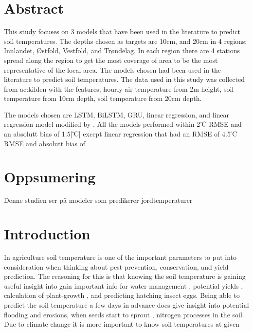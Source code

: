 
\section*{Abstract}
This study focuses on 3 models that have been used in the literature to predict soil temperatures. The depths chosen as targets are 10cm, and 20cm in 4 regions; Innlandet, Østfold, Vestfold, and Trøndelag. In each region there are 4 stations spread along the region to get the most coverage of area to be the most representative of the local area. The models chosen had been used in the literature to predict soil temperatures. The data used in this study was collected from \acrshort{ac:kilden} with the features; hourly air temperature from 2m height, soil temperature from 10cm depth, soil temperature from 20cm depth.

The models chosen are LSTM, BiLSTM, GRU, linear regression, and linear regression model modified by \citeauthor{plauborg_simple_2002}. All the models performed within 2℃ RMSE and an absolutt bias of 1.5|℃| except linear regression that had an RMSE of 4.5℃ RMSE  and absolutt bias of 

\section*{Oppsumering}
Denne studien ser på modeler som predikerer jordtemperaturer






\section{Introduction}

In agriculture soil temperature is one of the important parameters to put into consideration when thinking about pest prevention, conservation, and yield prediction. The reasoning for this is that knowing the soil temperature is gaining useful insight into
gain important info for water management \cite{alizamir_advanced_2020},
potential yields \cite{sim_prediction_2020},
calculation of plant-growth \cite{li_modeling_2020},
and predicting hatching insect eggs\cite{nanushi_pest_2022,johnson_effects_2010}.
Being able to predict the soil temperature a few days in advance does give insight into
potential flooding and erosions\cite{stuurop_influence_2022},
when seeds start to sprout \cite{li_modeling_2020},
nitrogen processes \cite{rankinen_simple_2004} in the soil.
Due to climate change it is more important to know soil temperatures at given 

